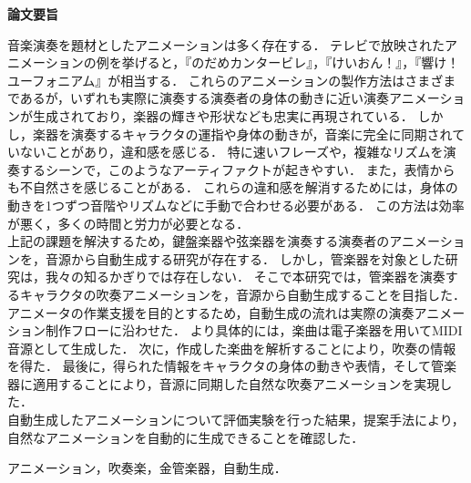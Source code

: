 \begin{center}
{\bf {\large 論文要旨}}
\end{center}

\vspace{3ex}
音楽演奏を題材としたアニメーションは多く存在する．
テレビで放映されたアニメーションの例を挙げると，『のだめカンタービレ』，『けいおん！』，『響け！ユーフォニアム』が相当する．
これらのアニメーションの製作方法はさまざまであるが，いずれも実際に演奏する演奏者の身体の動きに近い演奏アニメーションが生成されており，楽器の輝きや形状なども忠実に再現されている．
%
しかし，楽器を演奏するキャラクタの運指や身体の動きが，音楽に完全に同期されていないことがあり，違和感を感じる．
特に速いフレーズや，複雑なリズムを演奏するシーンで，このようなアーティファクトが起きやすい．
また，表情からも不自然さを感じることがある．
これらの違和感を解消するためには，身体の動きを1つずつ音階やリズムなどに手動で合わせる必要がある．
この方法は効率が悪く，多くの時間と労力が必要となる．\\
%
\indent
上記の課題を解決するため，鍵盤楽器や弦楽器を演奏する演奏者のアニメーションを，音源から自動生成する研究が存在する．
しかし，管楽器を対象とした研究は，我々の知るかぎりでは存在しない．
そこで本研究では，管楽器を演奏するキャラクタの吹奏アニメーションを，音源から自動生成することを目指した．
アニメータの作業支援を目的とするため，自動生成の流れは実際の演奏アニメーション制作フローに沿わせた．
より具体的には，楽曲は電子楽器を用いてMIDI音源として生成した．
次に，作成した楽曲を解析することにより，吹奏の情報を得た．
最後に，得られた情報をキャラクタの身体の動きや表情，そして管楽器に適用することにより，音源に同期した自然な吹奏アニメーションを実現した．\\
%
\indent
自動生成したアニメーションについて評価実験を行った結果，提案手法により，自然なアニメーションを自動的に生成できることを確認した．

\vspace{4ex}

\noindent
{}

\noindent
アニメーション，吹奏楽，金管楽器，自動生成．
